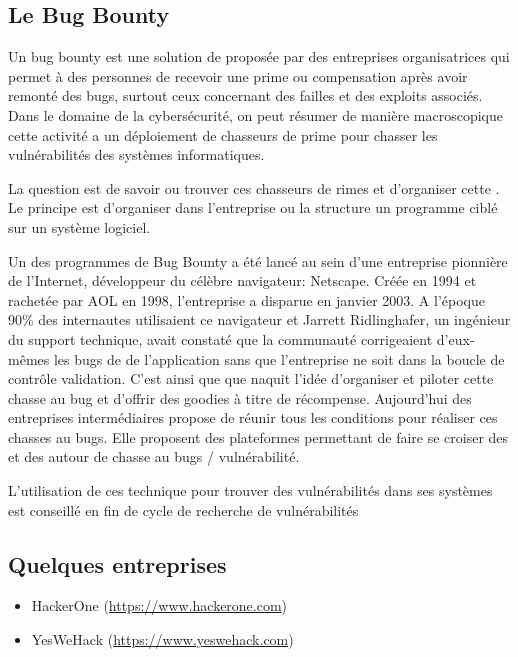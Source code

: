 
\subsection{Le Bug Bounty}

Un bug bounty est une solution de  proposée par des entreprises organisatrices qui permet à des personnes de recevoir une prime ou compensation après avoir remonté des bugs, surtout ceux concernant des failles et des exploits associés. Dans le domaine de la cybersécurité, on peut résumer de manière macroscopique cette activité  a un déploiement de chasseurs de prime pour chasser les vulnérabilités  des systèmes informatiques.

La question est de savoir ou trouver ces chasseurs de rimes et d'organiser cette . Le principe est d'organiser dans l'entreprise ou la structure un programme ciblé sur un système logiciel.

Un des programmes de Bug Bounty  a été lancé au sein d’une entreprise pionnière de l'Internet, développeur du célèbre navigateur: Netscape. Créée en 1994 et rachetée par AOL en 1998, l’entreprise a disparue en janvier 2003.
A l'époque 90\% des internautes utilisaient ce navigateur et Jarrett Ridlinghafer, un ingénieur du support technique, avait constaté que la communauté  corrigeaient d’eux-mêmes les bugs de de l'application sans que l'entreprise ne soit dans la boucle de contrôle validation. C'est ainsi que que naquit l'idée d'organiser et piloter cette chasse au bug et d'offrir des goodies à titre de récompense. 
Aujourd'hui des entreprises intermédiaires propose de réunir tous les conditions pour réaliser ces chasses au bugs.
Elle proposent des plateformes permettant de faire se croiser des  et des  autour de chasse au bugs / vulnérabilité.

L'utilisation de ces technique pour trouver des vulnérabilités dans ses systèmes est conseillé en fin de cycle de recherche de vulnérabilités

\subsection{Quelques entreprises}

\begin{itemize}
    \item HackerOne (\url{https://www.hackerone.com})
    \item YesWeHack (\url{https://www.yeswehack.com})
\end{itemize}


